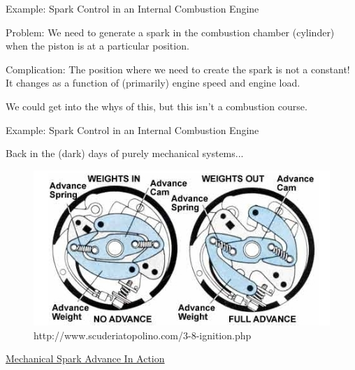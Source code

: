 \documentclass{beamer}
\begin{document}
	\begin{frame}{Example: Spark Control in an Internal Combustion Engine}
	
		Problem: We need to generate a spark in the combustion chamber (cylinder) when 
				 the piston is at a particular position.
		
		Complication: The position where we need to create the spark is not a constant!
					  It changes as a function of (primarily) engine speed and engine load.
					  
					  We could get into the whys of this, but this isn't a combustion course.
	
	\end{frame}	  
  
	\begin{frame}[t]{Example: Spark Control in an Internal Combustion Engine}
		
		Back in the (dark) days of purely mechanical systems...
			
		\begin{figure}
		\includegraphics[scale=0.75]{img/3-8-ignition_clip_image005.jpg}
		\caption{http://www.scuderiatopolino.com/3-8-ignition.php}
		\end{figure}
		\href{https://www.youtube.com/watch?v=RcmkbQVPz9E}{Mechanical Spark Advance In Action}
		
	\end{frame}
	
\end{document}
